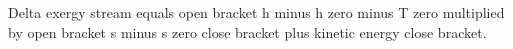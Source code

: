 Delta exergy stream equals open bracket h minus h zero minus T zero multiplied by open bracket s minus s zero close bracket plus kinetic energy close bracket.